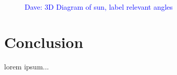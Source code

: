 \documentclass[11pt]{article}
\newcommand{\dnote}[1]{\textcolor{blue}{Dave: #1}}
\begin{document}
\begin{figure}
\begin{center}
\hspace{5mm}
\caption{\dnote{3D Diagram of sun, label relevant angles}}
\end{center}
\end{figure}



\section{Conclusion}


lorem ipsum...















\end{document}
